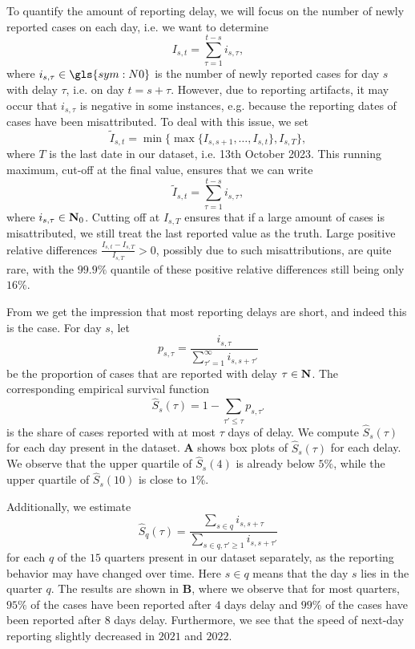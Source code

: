 To quantify the amount of reporting delay, we will focus on the number of newly reported cases on each day, i.e. we want to determine
$$
    I_{s,t} = \sum_{\tau = 1}^{t - s} i_{s,\tau},
$$
where $i_{s,\tau} \in \gls{sym:N0}$ is the number of newly reported cases for day $s$ with delay $\tau$, i.e. on day $t = s + \tau$. However, due to reporting artifacts, it may occur that $i_{s,\tau}$ is negative in some instances, e.g. because the reporting dates of cases have been misattributed. To deal with this issue, we set 
$$
    \tilde I_{s,t} = \min \{\max \{I_{s,s + 1}, \dots, I_{s, t}\}, I_{s, T}\},
$$
where $T$ is the last date in our dataset, i.e. 13th October 2023. This running maximum, cut-off at the final value, ensures that we can write 
$$
    \tilde I_{s,t} =  \sum_{\tau = 1}^{t - s} i_{s,\tau},
$$
where $i_{s,\tau} \in \mathbf N_0$. Cutting off at $I_{s,T}$ ensures that if a large amount of cases is misattributed, we still treat the last reported value as the truth. Large positive relative differences $ \frac{I_{s, t} - I_{s,T}}{I_{s,T}} > 0$, possibly due to such misattributions, are quite rare, with the $99.9\%$ quantile of these positive relative differences still being only $16\%$.

From  we get the impression that most reporting delays are short, and indeed this is the case. For day $s$, let
$$
    p_{s,\tau} = \frac{i_{s,\tau}}{\sum_{\tau' = 1}^\infty i_{s,s + \tau'}}
$$
be the proportion of cases that are reported with delay $\tau \in\mathbf N$. The corresponding empirical survival function 
$$
    \hat S_{s}(\tau) = 1 - \sum_{\tau' \leq \tau} p_{s,\tau'}
$$
is the share of cases reported with at most $\tau$ days of delay. We compute $\hat S_s(\tau)$ for each day present in the dataset.  \textbf{A} shows box plots of $\hat S_{s}(\tau)$ for each delay. We observe that the upper quartile of $\hat S_s(4)$ is already below $5\%$, while the upper quartile of $\hat S_s(10)$ is close to $1\%$. 

Additionally, we estimate 
$$
    \hat S_{q}(\tau) = \frac{\sum_{s \in q} i_{s,s + \tau}}{\sum_{s \in q, \tau' \geq 1} i_{s, s+ \tau'}}
$$
for each $q$ of the $15$ quarters present in our dataset separately, as the reporting behavior may have changed over time. Here $s\in q$ means that the day $s$ lies in the quarter $q$. The results are shown in  \textbf{B}, where we observe that for most quarters, $95\%$ of the cases have been reported after $4$ days delay and $99\%$ of the cases have been reported after $8$ days delay. 
Furthermore, we see that the speed of next-day reporting slightly decreased in $2021$ and $2022$.

